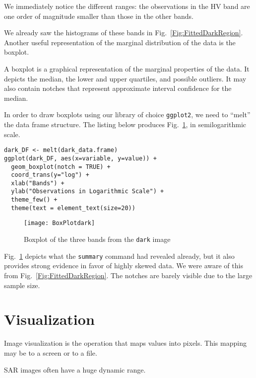 We immediately notice the different ranges: the observations in the HV band are one order of magnitude smaller than those in the other bands.

We already saw the histograms of these bands in Fig.~\ref{Fig:FittedDarkRegion}.
Another useful representation of the marginal distribution of the data is the boxplot.

A boxplot is a graphical representation of the marginal properties of the data.
It depicts the median, the lower and upper quartiles, and possible outliers.
It may also contain notches that represent approximate interval confidence for the median.

In order to draw boxplots using our library of choice \texttt{ggplot2}, we need to ``melt'' the data frame structure.
The listing below produces Fig.~\ref{Fig:BoxplotDark}, in semilogarithmic scale.

\begin{lstlisting}
dark_DF <- melt(dark_data.frame)
ggplot(dark_DF, aes(x=variable, y=value)) + 
  geom_boxplot(notch = TRUE) + 
  coord_trans(y="log") + 
  xlab("Bands") +
  ylab("Observations in Logarithmic Scale") + 
  theme_few() +
  theme(text = element_text(size=20))
\end{lstlisting}

\begin{figure}
\centering
\texttt{[image: BoxPlotdark]}
\caption{Boxplot of the three bands from the \texttt{dark} image}\label{Fig:BoxplotDark}
\end{figure}

Fig.~\ref{Fig:BoxplotDark} depicts what the \texttt{summary} command had revealed already, but it also provides strong evidence in favor of highly skewed data.
We were aware of this from Fig.~\ref{Fig:FittedDarkRegion}.
The notches are barely visible due to the large sample size.

\section{Visualization}

Image visualization is the operation that maps values into pixels\cite{IPVG:2008}.
This mapping may be to a screen or to a file.

SAR images often have a huge dynamic range.